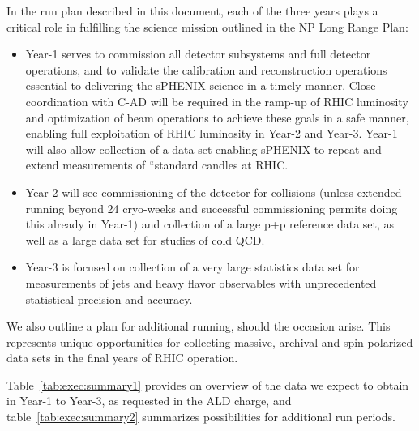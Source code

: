 In the run plan described in this document, each of the three years plays a critical role in fulfilling the science mission outlined in the NP Long Range Plan: 
\begin{itemize}
\item Year-1 serves to commission all detector subsystems and full detector operations, and to  validate the calibration and reconstruction operations essential to delivering the sPHENIX science in a timely manner. Close coordination with C-AD will be required in the ramp-up of RHIC luminosity and optimization of beam operations to achieve these goals in a safe manner, enabling full exploitation of RHIC luminosity in Year-2 and Year-3. Year-1 will also allow collection of a \auau data set enabling sPHENIX to repeat and extend measurements of ``standard candles at RHIC. 
\item Year-2 will see commissioning of the detector for \pp collisions (unless extended running beyond 24 cryo-weeks and successful \auau commissioning permits doing this already in Year-1) and collection of a large p+p reference data set, as well as a large \pAu data set for studies of cold QCD. 
\item Year-3 is focused on collection of a very large statistics \auau data set for measurements of jets and heavy flavor observables with unprecedented statistical precision and accuracy. 
\end{itemize}

We also outline a plan for additional running, should the occasion arise. This represents unique opportunities for collecting massive, archival \auau and spin polarized \pp data sets in the final years of RHIC operation.

Table~\ref{tab:exec:summary1} provides on overview of the data we expect to obtain in Year-1 to Year-3, as requested in the ALD charge, and table~\ref{tab:exec:summary2} summarizes possibilities for additional run periods.
